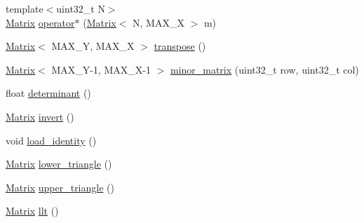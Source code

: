 \begin{DoxyCompactItemize}
\item 
{\footnotesize template$<$uint32\-\_\-t N$>$ }\\\hyperlink{classetk_1_1_matrix}{Matrix} \hyperlink{classetk_1_1_matrix_a6744d34d9ce5246c360648aec83c1abe}{operator$\ast$} (\hyperlink{classetk_1_1_matrix}{Matrix}$<$ N, M\-A\-X\-\_\-\-X $>$ m)
\item 
\hyperlink{classetk_1_1_matrix}{Matrix}$<$ M\-A\-X\-\_\-\-Y, M\-A\-X\-\_\-\-X $>$ \hyperlink{classetk_1_1_matrix_a6c4e00132a3b9299bdcf2b05db4750f8}{transpose} ()
\item 
\hyperlink{classetk_1_1_matrix}{Matrix}$<$ M\-A\-X\-\_\-\-Y-\/1, M\-A\-X\-\_\-\-X-\/1 $>$ \hyperlink{classetk_1_1_matrix_a2188e56d24f9b5133bb763fd569cfb2e}{minor\-\_\-matrix} (uint32\-\_\-t row, uint32\-\_\-t col)
\item 
float \hyperlink{classetk_1_1_matrix_ae177b98134c51529b481696ef59ff115}{determinant} ()
\item 
\hyperlink{classetk_1_1_matrix}{Matrix} \hyperlink{classetk_1_1_matrix_aa5fabab4740967a5d4b7b13b3ae48288}{invert} ()
\item 
void \hyperlink{classetk_1_1_matrix_a1b16c550358a1373a1ce8d808b5464bc}{load\-\_\-identity} ()
\item 
\hyperlink{classetk_1_1_matrix}{Matrix} \hyperlink{classetk_1_1_matrix_a4ccb9a463ad121b882d552dd0225a03d}{lower\-\_\-triangle} ()
\item 
\hyperlink{classetk_1_1_matrix}{Matrix} \hyperlink{classetk_1_1_matrix_a0a84efb6306b845df59fc823a88b9118}{upper\-\_\-triangle} ()
\item 
\hyperlink{classetk_1_1_matrix}{Matrix} \hyperlink{classetk_1_1_matrix_a1e88bf778fd404bc846cc3d260625cd9}{llt} ()
\end{DoxyCompactItemize}


